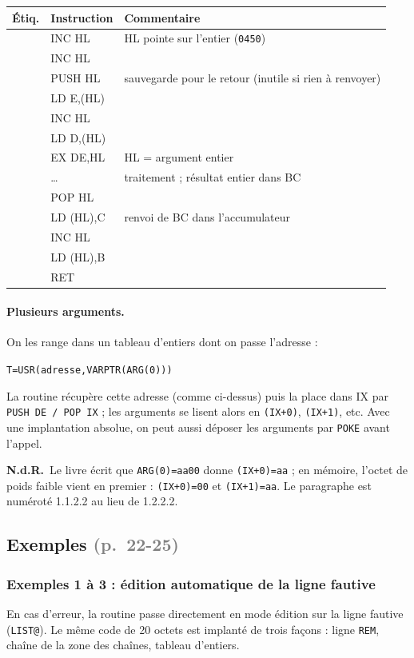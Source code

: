 \documentclass[a4paper,10pt]{article}
\makeatletter
\newcommand{\hex}[1]{\texttt{#1}}
\newcommand{\reg}[1]{\textsf{#1}}
\newcommand{\pg}[1]{\texorpdfstring{\textcolor{gray}{\small(p.~#1)}}{}}
\newcommand{\nota}[1]{\textcolor{red!60!black}{\small\textbf{N.d.R.}~#1}}
\newenvironment{src}
  {\small\begin{longtable}{@{}>{\ttfamily}l>{\ttfamily}l>{\raggedright\arraybackslash}p{8.6cm}@{}}
   \toprule
   \normalfont\bfseries Étiq. & \normalfont\bfseries Instruction & \textbf{Commentaire}\\
   \midrule\endhead
   \bottomrule\endfoot}
  {\end{longtable}}
\makeatother
\begin{document}
\begin{src}
 & INC HL & HL pointe sur l'entier (\hex{0450}) \\
 & INC HL & \\
 & PUSH HL & sauvegarde pour le retour (inutile si rien à renvoyer) \\
 & LD E,(HL) & \\
 & INC HL & \\
 & LD D,(HL) & \\
 & EX DE,HL & HL = argument entier \\
 & \dots & traitement ; résultat entier dans BC \\
 & POP HL & \\
 & LD (HL),C & renvoi de BC dans l'accumulateur \\
 & INC HL & \\
 & LD (HL),B & \\
 & RET & \\
\end{src}

\paragraph{Plusieurs arguments.} On les range dans un tableau d'entiers dont
on passe l'adresse :
\begin{center}\texttt{T=USR(adresse,VARPTR(ARG(0)))}\end{center}
La routine
récupère cette adresse (comme ci-dessus) puis la place dans \reg{IX} par
\texttt{PUSH DE / POP IX} ; les arguments se lisent alors en
\texttt{(IX+0)}, \texttt{(IX+1)}, etc. Avec une implantation absolue, on peut
aussi déposer les arguments par \texttt{POKE} avant l'appel.

\nota{Le livre écrit que \texttt{ARG(0)=aa00} donne \texttt{(IX+0)=aa} ; en
mémoire, l'octet de poids faible vient en premier : \texttt{(IX+0)=00} et
\texttt{(IX+1)=aa}. Le paragraphe est numéroté 1.1.2.2 au lieu de 1.2.2.2.}

\subsection{Exemples \pg{22-25}}

\subsubsection*{Exemples 1 à 3 : édition automatique de la ligne fautive}
En cas d'erreur, la routine passe directement en mode édition sur la ligne
fautive (\texttt{LIST@}). Le même code de 20 octets est implanté de trois
façons : ligne \texttt{REM}, chaîne de la zone des chaînes, tableau
d'entiers.
\end{document}
